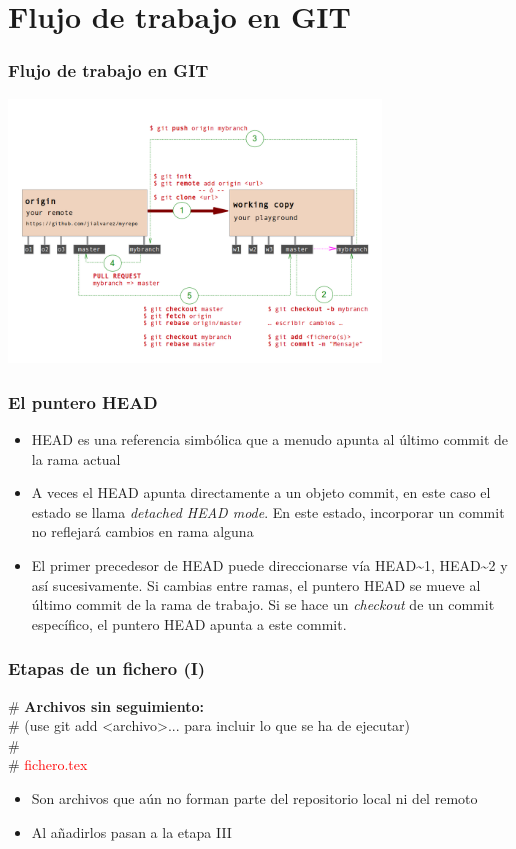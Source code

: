 \section{Flujo de trabajo en GIT}
\frame
{
\frametitle{Flujo de trabajo en GIT}
\begin{center}
 \includegraphics[height=7cm]{imgs/gitworkflow.png}
\end{center}
}

\frame
{
\frametitle{El puntero HEAD}
\begin{itemize}
 \item HEAD es una referencia simbólica que a menudo apunta al último commit de la rama actual
 \item A veces el HEAD apunta directamente a un objeto commit, en este caso el estado se llama \textit{detached HEAD mode}. En este estado, incorporar un commit no reflejará cambios en rama alguna
 \item El primer precedesor de HEAD puede direccionarse vía HEAD\textasciitilde1, HEAD\textasciitilde2 y así sucesivamente. Si cambias entre ramas, el puntero HEAD se mueve al último commit de la rama de trabajo. Si se hace un \textit{checkout} de un commit específico, el puntero HEAD apunta a este commit.
\end{itemize}
}

\frame
{
\frametitle{Etapas de un fichero (I)}
\begin{framed}
\# \textbf{Archivos sin seguimiento:}\\
\#   (use git add <archivo>... para incluir lo que se ha de ejecutar)\\
\#\\
\#	\textcolor{red}{fichero.tex}
\end{framed}

\begin{itemize}
 \item Son archivos que aún no forman parte del repositorio local ni del remoto
 \item Al añadirlos pasan a la etapa III
\end{itemize}
}

